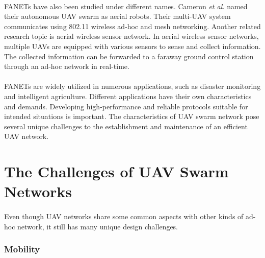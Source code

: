 \documentclass[a4paper,12pt]{report}
\begin{document}
\paragraph{}
FANETs have also been studied under different names\cite{bekmezci2013flying}. Cameron {\it et al.}\cite{cameron2010suaave} named their autonomous UAV swarm as aerial robots. Their multi-UAV system communicates using 802.11 wireless ad-hoc and mesh networking. Another related research topic is aerial wireless sensor network\cite{ahmed2011link,ahmed2016importance, ahmed2013utilizing}. In aerial wireless sensor networks, multiple UAVs are equipped with various sensors to sense and collect information. The collected information can be forwarded to a faraway ground control station through an ad-hoc network in real-time.

\paragraph{}
FANETs are widely utilized in numerous applications, such as disaster monitoring and intelligent agriculture. Different applications have their own characteristics and demands. Developing high-performance and reliable protocols suitable for intended situations is important. The characteristics of UAV swarm network pose several unique challenges to the establishment and maintenance of an efficient UAV network. 

\section{The Challenges of UAV Swarm Networks}

\paragraph{}
Even though UAV networks share some common aspects with other kinds of ad-hoc network, it still has many unique design challenges. 

\subsubsection{Mobility}
\end{document}
